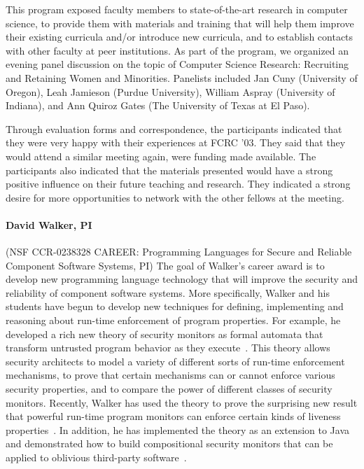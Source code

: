 \documentclass[11pt]{article}
\begin{document}
This program exposed faculty members to state-of-the-art research in
computer science, to provide them with materials and training that
will help them improve their existing curricula and/or introduce new
curricula, and to establish contacts with other faculty at peer
institutions.  As part of the program, we organized an evening panel
discussion on the topic of Computer Science Research: Recruiting and
Retaining Women and Minorities.  Panelists included Jan Cuny
(University of Oregon), Leah Jamieson (Purdue University), William
Aspray (University of Indiana), and Ann Quiroz Gates (The University
of Texas at El Paso).  

Through evaluation forms and correspondence, the participants
indicated that they were very happy with their experiences at
FCRC '03. They said that they would attend a similar meeting again,
were funding made available. The participants also indicated that the
materials presented would have a strong positive influence on their
future teaching and research.  They indicated a strong desire for more
opportunities to network with the other fellows at the meeting.

%

\paragraph*{David Walker, PI} (NSF CCR-0238328 CAREER: Programming Languages for Secure and Reliable Component Software
Systems, PI)
The goal of Walker's career award is to develop new programming language
technology that will improve the security and reliability of component software systems.
More specifically, Walker and his students have begun to develop new techniques for defining,
implementing and reasoning about run-time enforcement of program properties.
For example, he developed a rich new theory of security monitors as formal
automata that transform untrusted program behavior as they 
execute~\cite{ligatti+:edit-automata}.
This theory allows security
architects to model a variety of different sorts of run-time
enforcement mechanisms, to prove that certain mechanisms can or cannot
enforce various security properties, and to compare the power of
different classes of security monitors.    Recently, Walker 
has used the theory to prove the surprising new result that powerful run-time
program monitors can enforce certain kinds of liveness properties~\cite{ligatti+:renewal}.  
In addition, he has implemented the theory as an extension to Java and demonstrated
how to build compositional security monitors that can be applied to oblivious third-party 
software~\cite{bauer+:pldi05}.
\end{document}
